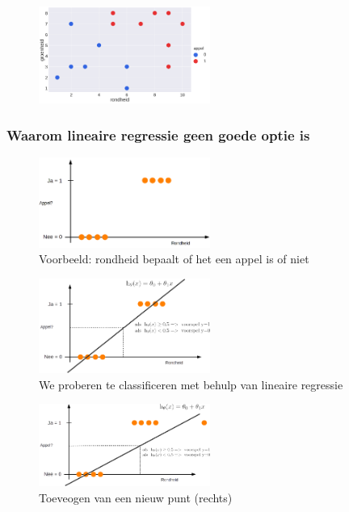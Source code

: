 \documentclass{article}
\begin{document}
\begin{figure}[H]
    \centering
    \includegraphics[width=0.5\textwidth]{multilabel-classifier3.png}
\end{figure}

\subsubsection{Waarom lineaire regressie geen goede optie is}

\begin{figure}[H]
    \centering
    \includegraphics[width=0.5\textwidth]{classificatie-regressie.png}
    \caption{Voorbeeld: rondheid bepaalt of het een appel is of niet}
\end{figure}

\begin{figure}[H]
    \centering
    \includegraphics[width=0.5\textwidth]{classificatie-regressie2.png}
    \caption{We proberen te classificeren met behulp van lineaire regressie}
\end{figure}

\begin{figure}[H]
    \centering
    \includegraphics[width=0.5\textwidth]{classificatie-regressie3.png}
    \caption{Toeveogen van een nieuw punt (rechts)}
\end{figure}
\end{document}

